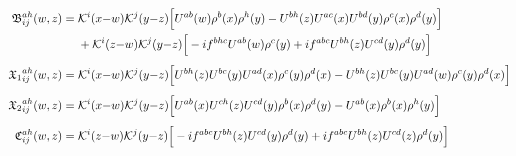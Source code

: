 \begin{align}
\mathfrak B^{ah}_{ij}(w,z)=\;&\mathcal{K}^{i}(x{-}w)\mathcal{K}^{j}(y{-}z)\Big[U^{ab}(w)\rho^{b}(x)\rho^{h}(y)-U^{bh}(z)U^{ac}(x)U^{bd}(y)\rho^{c}(x)\rho^{d}(y)\Big]\notag\\
&+\mathcal{K}^{i}(z{-}w)\mathcal{K}^{j}(y{-}z)\Big[-if^{bhc}U^{ab}(w)\rho^{c}(y)+if^{abc}U^{bh}(z)U^{cd}(y)\rho^{d}(y)\Big]\label{eq:LLP2PB}
\\[4pt]
{\mathfrak X_1}^{ah}_{ij}(w,z)=\;&\mathcal{K}^{i}(x{-}w)\mathcal{K}^{j}(y{-}z)\Big[U^{bh}(z)U^{bc}(y)U^{ad}(x)\rho^{c}(y)\rho^{d}(x)-U^{bh}(z)U^{bc}(y)U^{ad}(w)\rho^{c}(y)\rho^{d}(x)\Big]\label{eq:LLP2PX1}
\\[4pt]
{\mathfrak X_2}^{ah}_{ij}(w,z)=\;&\mathcal{K}^{i}(x{-}w)\mathcal{K}^{j}(y{-}z)\Big[U^{ab}(x)U^{ch}(z)U^{cd}(y)\rho^{b}(x)\rho^{d}(y)-U^{ab}(x)\rho^{b}(x)\rho^{h}(y)\Big]\label{eq:LLP2PX2}
\\[4pt]
\mathfrak C^{ah}_{ij}(w,z)=\;&\mathcal{K}^{i}(z{-}w)\mathcal{K}^{j}(y{-}z)\Big[-if^{abc}U^{bh}(z)U^{cd}(y)\rho^{d}(y)+if^{abc}U^{bh}(z)U^{cd}(z)\rho^{d}(y)\Big]\label{eq:LLP2PC}
\end{align}
